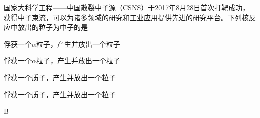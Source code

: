 国家大科学工程——中国散裂中子源（CSNS）于2017年8月28日首次打靶成功，获得中子束流，可以为诸多领域的研究和工业应用提供先进的研究平台。下列核反应中放出的粒子为中子的是\paren[]
\begin{choices}
  \item {}俘获一个\(\alpha\)粒子，产生并放出一个粒子
  \item {}俘获一个\(\alpha\)粒子，产生并放出一个粒子
  \item {}俘获一个质子，产生并放出一个粒子
  \item {}俘获一个质子，产生并放出一个粒子
\end{choices}
\begin{answer}
    B
\end{answer}